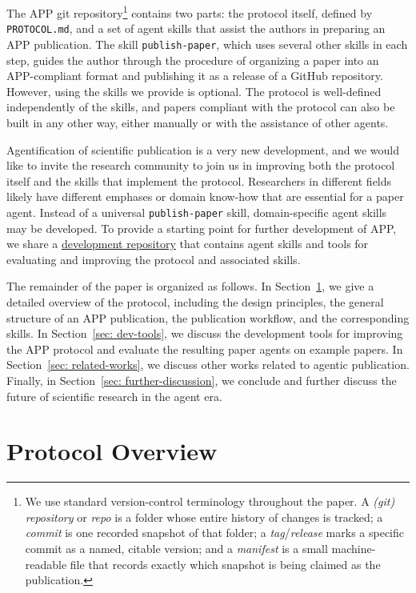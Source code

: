 \documentclass{article}
\newcommand{\devrepourl}{https://github.com/XiaoliangQi/agentic-publication-protocol-dev.app}
\begin{document}
The APP git repository\footnote{We use standard version-control terminology throughout the paper. A \emph{(git) repository} or \emph{repo} is a folder whose entire history of changes is tracked; a \emph{commit} is one recorded snapshot of that folder; a \emph{tag}/\emph{release} marks a specific commit as a named, citable version; and a \emph{manifest} is a small machine-readable file that records exactly which snapshot is being claimed as the publication.} contains two parts: the protocol itself, defined by \texttt{PROTOCOL.md}, and a set of agent skills that assist the authors in preparing an APP publication. The skill \texttt{publish-paper}, which uses several other skills in each step, guides the author through the procedure of organizing a paper into an APP-compliant format and publishing it as a release of a GitHub repository. However, using the skills we provide is optional. The protocol is well-defined independently of the skills, and papers compliant with the protocol can also be built in any other way, either manually or with the assistance of other agents. 

Agentification of scientific publication is a very new development, and we would like to invite the research community to join us in improving both the protocol itself and the skills that implement the protocol. Researchers in different fields likely have different emphases or domain know-how that are essential for a paper agent. Instead of a universal \texttt{publish-paper} skill, domain-specific agent skills may be developed. To provide a starting point for further development of APP, we share a \href{\devrepourl}{development repository} that contains agent skills and tools for evaluating and improving the protocol and associated skills. 

The remainder of the paper is organized as follows. In Section~\ref{sec: protocol-details}, we give a detailed overview of the protocol, including the design principles, the general structure of an APP publication, the publication workflow, and the corresponding skills. In Section~\ref{sec: dev-tools}, we discuss the development tools for improving the APP protocol and evaluate the resulting paper agents on example papers. In Section~\ref{sec: related-works}, we discuss other works related to agentic publication. Finally, in Section~\ref{sec: further-discussion}, we conclude and further discuss the future of scientific research in the agent era.


\section{Protocol Overview}\label{sec: protocol-details}
\end{document}

